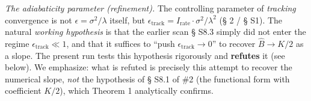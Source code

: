\documentclass[12pt]{iopart}
\begin{document}
\emph{The adiabaticity parameter (refinement).} The controlling parameter of \emph{tracking} convergence is not \(\epsilon = \sigma^2/\lambda\) itself, but \(\epsilon_{\text{track}} = I_{\text{rate}}\cdot\sigma^2/\lambda^2\) (§ 2 / § S1). The natural \emph{working hypothesis} is that the earlier scan \cite{Andriishin2026b} § S8.3 simply did not enter the regime \(\epsilon_{\text{track}} \ll 1\), and that it suffices to ``push \(\epsilon_{\text{track}} \to 0\)'' to recover \(\hat B \to K/2\) as a slope. The present run tests this hypothesis rigorously and \textbf{refutes} it (see below). We emphasize: what is refuted is precisely this attempt to recover the numerical slope, \emph{not} the hypothesis of § S8.1 of \#2 \cite{Andriishin2026b} (the functional form with coefficient \(K/2\)), which Theorem 1 analytically confirms.
\end{document}
